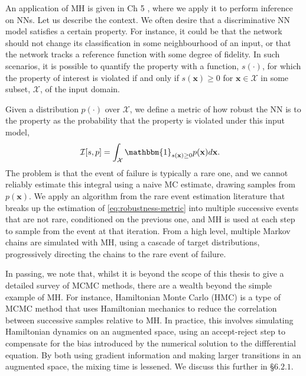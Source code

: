 An application of MH is given in Ch 5 \citep{webb2018statistical}, where we apply it to perform inference on NNs. Let us describe the context. We often desire that a discriminative NN model satisfies a certain property. For instance, it could be that the network should not change its classification in some neighbourhood of an input, or that the network tracks a reference function with some degree of fidelity. In such scenarios, it is possible to quantify the property with a function, $s(\cdot)$, for which the property of interest is violated if and only if $s(\mathbf{x})\ge0$ for $\mathbf{x}\in\mathcal{X}$ in some subset, $\mathcal{X}$, of the input domain.

Given a distribution $p(\cdot)$ over $\mathcal{X}$, we define a metric of how robust the NN is to the property as the probability that the property is violated under this input model,
\begin{align}\label{eq:robustness-metric}
	\mathcal{I}[s,p] &= \int_\mathcal{X}\mathbbm{1}_{s(\mathbf{x})\ge0}p(\mathbf{x})d\mathbf{x}.
\end{align}
The problem is that the event of failure is typically a rare one, and we cannot reliably estimate this integral using a naive MC estimate, drawing samples from $p(\mathbf{x})$. We apply an algorithm from the rare event estimation literature that breaks up the estimation of \eqref{eq:robustness-metric} into multiple successive events that are not rare, conditioned on the previous one, and MH is used at each step to sample from the event at that iteration. From a high level, multiple Markov chains are simulated with MH, using a cascade of target distributions, progressively directing the chains to the rare event of failure.

In passing, we note that, whilst it is beyond the scope of this thesis to give a detailed survey of MCMC methods, there are a wealth beyond the simple example of MH. For instance, Hamiltonian Monte Carlo (HMC) \citep{Neal2011} is a type of MCMC method that uses Hamiltonian mechanics to reduce the correlation between successive samples relative to MH. In practice, this involves simulating Hamiltonian dynamics on an augmented space, using an accept-reject step to compensate for the bias introduced by the numerical solution to the diffferential equation. By both using gradient information and making larger transitions in an augmented space, the mixing time is lessened. We discuss this further in \S$6.2.1$.

